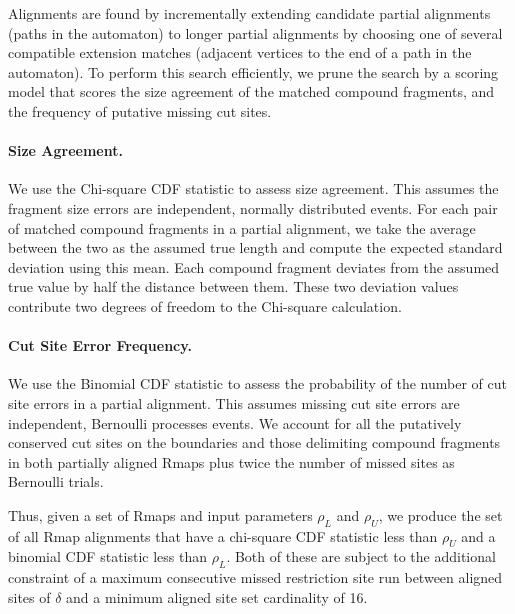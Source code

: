 Alignments are found by incrementally extending candidate partial alignments (paths in the automaton) to longer partial alignments by choosing one of several compatible extension matches (adjacent vertices to the end of a path in the automaton).  To perform this search efficiently, we prune the search by a scoring model that scores the size agreement of the matched compound fragments, and the frequency of putative missing cut sites.

\paragraph{Size Agreement.}
We use the Chi-square CDF statistic to assess size agreement.  This assumes the fragment size errors are independent, normally distributed events.  For each pair of matched compound fragments in a partial alignment, we take the average between the two as the assumed true length and
compute the expected standard deviation using this mean.  Each compound fragment deviates from the assumed true value by half the distance between them.  These two deviation values contribute two degrees of freedom to the Chi-square calculation.

\paragraph{Cut Site Error Frequency.}
We use the Binomial CDF statistic to assess the probability of the number of cut site errors in a partial alignment.   This assumes missing cut site errors are independent, Bernoulli processes events.  We account for all the putatively conserved cut sites on the boundaries and those delimiting compound fragments in both partially aligned Rmaps plus twice the number of missed sites as Bernoulli trials. %

Thus, given a set of Rmaps and input parameters $\rho_{L}$ and $\rho_{U}$, we produce the set of all Rmap alignments that have a chi-square CDF statistic less than $\rho_U$ and a binomial CDF statistic less than $\rho_L$.  Both of these are subject to the additional constraint of a maximum consecutive missed restriction site run between aligned sites of $\delta$ and a minimum aligned site set cardinality of 16. 

